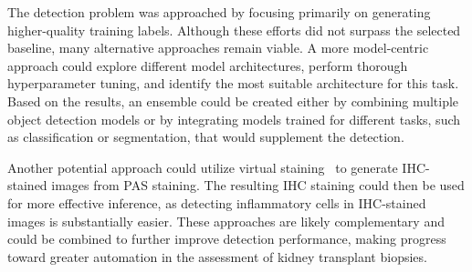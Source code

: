 The detection problem was approached by focusing primarily on generating higher-quality training labels. Although these efforts did not surpass the selected baseline, many alternative approaches remain viable. A more model-centric approach could explore different model architectures, perform thorough hyperparameter tuning, and identify the most suitable architecture for this task. Based on the results, an ensemble could be created either by combining multiple object detection models or by integrating models trained for different tasks, such as classification or segmentation, that would supplement the detection.

Another potential approach could utilize virtual staining~\cite{Bai2023} to generate IHC-stained images from PAS staining. The resulting IHC staining could then be used for more effective inference, as detecting inflammatory cells in IHC-stained images is substantially easier. These approaches are likely complementary and could be combined to further improve detection performance, making progress toward greater automation in the assessment of kidney transplant biopsies.
